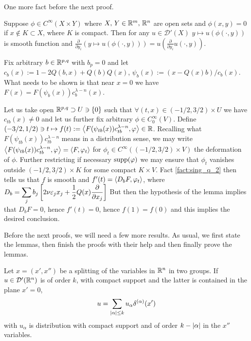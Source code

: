 \documentclass[10pt]{article} %
\newcommand{\D}{\mathcal{D}}
\theoremstyle{definition}
\theoremstyle{remark}
\begin{document}
One more fact before the next proof.
\begin{myfact}
	Suppose $\phi\in C^\infty(X\times Y)$ where $X,\,Y\in\mathbb{R}^m,\,\mathbb{R}^n$ are open sets and
	$\phi(x,y)=0$ if $x\notin K\subset X$, where $K$ is compact. Then for any $u\in\D'(X)$
	$y\mapsto u(\phi(\cdot,y))$ is smooth function and $\frac{\partial}{\partial y_i}\left( y\mapsto u(\phi(\cdot,y)) \right)
	=u\left( \frac{\partial}{\partial y_i}u(\cdot,y) \right)$.
	\label{fact:sing_q_2}
\end{myfact}
\begin{myproof}
	Fix arbitrary $b\in\mathbb{R}^{p,q}$ with $b_p=0$ and let $c_b(x):=1-2Q(b,x)+Q(b)Q(x)$, $\psi_b(x):=(x-Q(x)b)/c_b(x)$.
	What needs to be shown is that near $x=0$ we have $F(x)=F(\psi_b(x))c_b^{\lambda-n}(x)$.

	Let us take open $\mathbb{R}^{p,q}\supset U\ni\left\{ 0 \right\}$ such that $\forall(t,x)\in(-1/2,3/2)\times U$
	we have $c_{tb}(x)\neq0$ and let us further fix arbitrary $\phi\in C_0^\infty(V)$. Define
	$(-3/2,1/2)\ni t\mapsto f(t):=\left<F(\psi_{tb}(x))c_{tb}^{\lambda-n},\varphi\right>\in\mathbb{R}$.
	Recalling what $F(\psi_{tb}(x))c_{tb}^{\lambda-n}$ means in a distribution sense,
	we may write $\left<F(\psi_{tb}(x))c_{tb}^{\lambda-n},\varphi\right>=\left<F,\varphi_t\right>$ for $\phi_t\in C^\infty( (-1/2,3/2)\times V)$
	the deformation of $\phi$. Further restricting if necessary $\operatorname{supp}(\varphi)$ we may ensure that $\phi_t$
	vanishes outside $(-1/2,3/2)\times K$ for some compact $K\times V$. Fact \ref{fact:sing_q_2} then tells us that
	$f$ is smooth and $f'(t)=\left<D_bF,\varphi_t\right>$, where $D_b=\sum_jb_j\mysbra{
{2\nu\varepsilon_jx_j+\frac{ 1 }{ 2 }Q(x)\frac{ \partial}{ \partial x_j } }
	}$
	But then the hypothesis of the lemma implies that $D_bF=0$, hence $f'(t)=0$, hence $f(1)=f(0)$ and
	this implies the desired conclusion.
\end{myproof}
Before the next proofs, we will need a few more results. As usual, we first state the lemmas, then finish the proofs with their
help and then finally prove the lemmas.
\begin{myfact}
	\label{fact:sing_q_3}
	Let $x=(x',x'')$ be a splitting of the variables in $\mathbb{R}^n$ in two groups. If $u\in\D'(\R^n)$ is of order
	$k$, with compact support and the latter is contained in the plane $x'=0$,
	\[u=\sum_{\myabs{\alpha}\leq k}u_{\alpha}\delta^{(\alpha)}(x')\]
	with $u_\alpha$ is distribution with compact support and of order $k-\left|\alpha\right|$ in the $x''$ variables.
\end{myfact}
\end{document}
